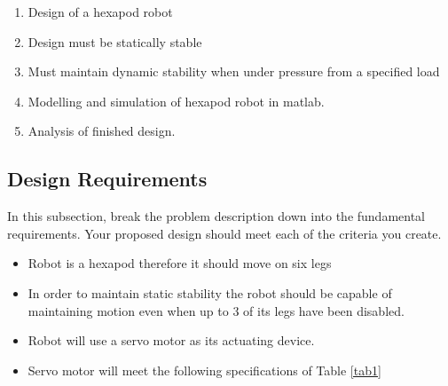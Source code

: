\begin{enumerate}
	\item Design of a hexapod robot
	
	\item Design must be statically stable
	
	\item Must maintain dynamic stability when under pressure from a specified load
	
	\item Modelling and simulation of hexapod robot in matlab.
	
	\item Analysis of finished design.
	
\end{enumerate}





\subsection{Design Requirements}
In this subsection, break the problem description down into the fundamental requirements. Your proposed design should meet each of the criteria you create.

\begin{itemize}
	\item Robot is a hexapod therefore it should move on six legs
	\item In order to maintain static stability the robot should be capable of maintaining motion even when up to 3 of its legs have been disabled.
	\item Robot will use a servo motor as its actuating device.
	\item Servo motor will meet the following specifications of Table \ref{tab1}
	\end{itemize}

